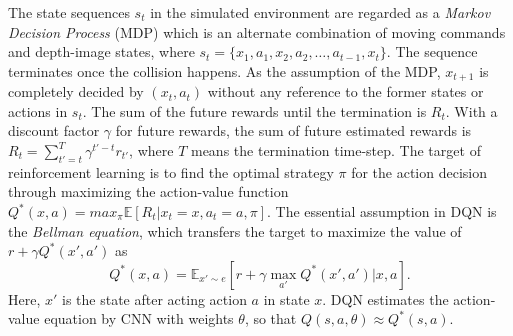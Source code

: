 The state sequences $s_t$ in the simulated environment are regarded as a \textit{Markov Decision Process} (MDP) which is an alternate combination of moving commands and depth-image states, where $s_t = \{x_1,a_1,x_2,a_2,\dots, a_{t-1},x_t\}$. The sequence terminates once the collision happens. As the assumption of the MDP, $x_{t+1}$ is completely decided by $(x_t, a_t)$ without any reference to the former states or actions in $s_t$. The sum of the future rewards until the termination is $R_t$. With a discount factor $\gamma$ for future rewards, the sum of future estimated rewards is $R_t = \sum_{t'=t}^{T} \gamma^{t'-t} r_{t'}$, where $T$ means the termination time-step. The target of reinforcement learning is to find the optimal strategy $\pi$ for the action decision through maximizing the action-value function $Q^*(x,a) = max_{\pi}\mathbb{E}[R_t|x_t=x,a_t=a,\pi]$.
The essential assumption in DQN \cite{mnih2015human} is the \textit{Bellman equation}, which transfers the target to maximize the value of $r+\gamma Q^{*}(x',a')$ as
\[ Q^{*}(x,a)=\mathbb{E}_{{x'}\sim{e}}[r+\gamma \max \limits_{a'}Q^{*}(x',a')|x,a]. \]
Here, $x'$ is the state after acting action $a$ in state $x$.
DQN estimates the action-value equation by CNN with weights $\theta$, so that $Q(s,a,\theta) \approx Q^{*}(s,a)$.
